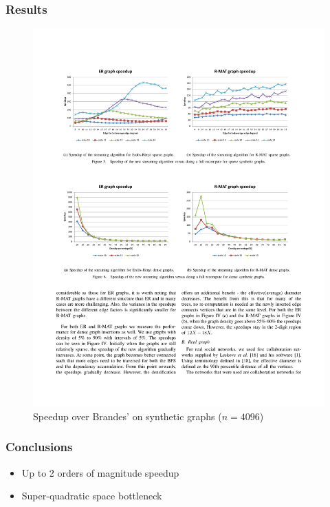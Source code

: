 \begin{frame}
  \frametitle{Results}

  \begin{figure}[t]
    \centering
    \includegraphics[width=\textwidth, height=0.7\textheight, keepaspectratio]{imgs/green-results1}
    \caption{Speedup over Brandes' on synthetic graphs ($n = 4096$)}
  \end{figure}

\end{frame}


\begin{frame}
  \frametitle{Conclusions}

  \begin{itemize}
    \item Up to 2 orders of magnitude speedup
    \item Super-quadratic space bottleneck
  \end{itemize}

\end{frame}


